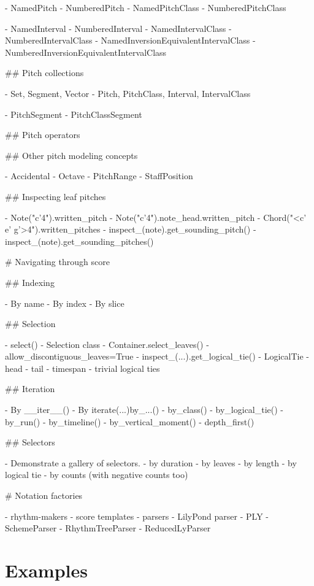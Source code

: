 \begin{markdown}
-   NamedPitch
-   NumberedPitch
-   NamedPitchClass
-   NumberedPitchClass

-   NamedInterval
-   NumberedInterval
-   NamedIntervalClass
-   NumberedIntervalClass
-   NamedInversionEquivalentIntervalClass
-   NumberedInversionEquivalentIntervalClass

## Pitch collections

-   Set, Segment, Vector
-   Pitch, PitchClass, Interval, IntervalClass

-   PitchSegment
-   PitchClassSegment

## Pitch operators

## Other pitch modeling concepts

-   Accidental
-   Octave
-   PitchRange
-   StaffPosition

## Inspecting leaf pitches

-   Note("c'4").written_pitch
-   Note("c'4").note_head.written_pitch
-   Chord("<c' e' g'>4").written_pitches
-   inspect_(note).get_sounding_pitch()
-   inspect_(note).get_sounding_pitches()

# Navigating through score

## Indexing

-   By name
-   By index
-   By slice

## Selection

-   select()
-   Selection class
-   Container.select_leaves()
    -   allow_discontiguous_leaves=True
-   inspect_(...).get_logical_tie()
-   LogicalTie
    -   head
    -   tail
    -   timespan
    -   trivial logical ties

## Iteration

-   By __iter__()
-   By iterate(...)by_...()
    -   by_class()
    -   by_logical_tie()
    -   by_run()
    -   by_timeline()
    -   by_vertical_moment()
    -   depth_first()

## Selectors

-   Demonstrate a gallery of selectors.
    -   by duration
    -   by leaves
    -   by length
    -   by logical tie
    -   by counts (with negative counts too)

# Notation factories

-   rhythm-makers
-   score templates
-   parsers
    -   LilyPond parser
    -   PLY
    -   SchemeParser
    -   RhythmTreeParser
    -   ReducedLyParser

\end{markdown}

\section{Examples}

